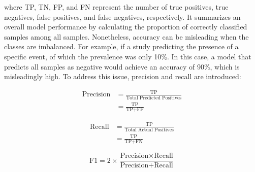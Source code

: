 where TP, TN, FP, and FN represent the number of true positives, true negatives, false positives, and false negatives, respectively. It summarizes an overall model performance by calculating the proportion of correctly classified samples among all samples. Nonetheless, accuracy can be misleading when the classes are imbalanced. For example, if a study predicting the presence of a specific event, of which the prevalence was only 10\%. In this case, a model that predicts all samples as negative would achieve an accuracy of 90\%, which is misleadingly high. To address this issue, precision and recall are introduced:

\begin{equation} \label{eq_precision}
    \begin{split}
    \text{Precision} &= \frac{\text{TP}}{\text{Total Predicted Positives}}\\
                    &=\frac{\text{TP}}{\text{TP} + \text{FP}}
    \end{split}
\end{equation}

\begin{equation} \label{eq_recall}
    \begin{split}
    \text{Recall} &= \frac{\text{TP}}{\text{Total Actual Positives}}\\
                &=\frac{\text{TP}}{\text{TP} + \text{FN}}
    \end{split}
\end{equation}

\begin{equation} \label{eq_f1}
    \text{F1} = 2 \times \frac{\text{Precision} \times \text{Recall}}{\text{Precision} + \text{Recall}}
\end{equation}


